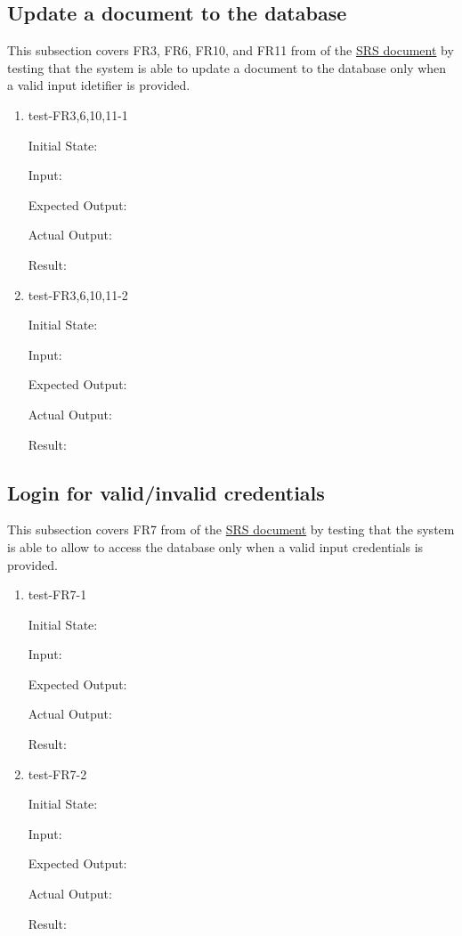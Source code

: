 \documentclass[12pt, titlepage]{article}
\begin{document}
\subsection{Update a document to the database} \label{section:3.3}

This subsection covers FR3, FR6, FR10, and FR11 from of the \href{https://github.com/Inreet-Kaur/capstone/blob/main/docs/SRS/SRS.pdf}{SRS document} by testing that the system is able to update a document to the database only when a valid input idetifier is provided.

\begin{enumerate}

  \item{test-FR3,6,10,11-1} \label{test-FR3,6,10,11-1}
  
  Initial State:

  Input:

  Expected Output:

  Actual Output:

  Result:


  \item{test-FR3,6,10,11-2} \label{test-FR3,6,10,11-2}

  Initial State:

  Input:

  Expected Output:

  Actual Output:

  Result:

\end{enumerate}

\subsection{Login for valid/invalid credentials} \label{section:3.4}

This subsection covers FR7 from of the \href{https://github.com/Inreet-Kaur/capstone/blob/main/docs/SRS/SRS.pdf} {SRS document} by testing that the system is able to allow to access the database only when a valid input credentials is provided.

\begin{enumerate}

  \item{test-FR7-1} \label{test-FR7-1}
  
  Initial State:

  Input:

  Expected Output:

  Actual Output:

  Result:


  \item{test-FR7-2} \label{test-FR7-2}

  Initial State:

  Input:

  Expected Output:

  Actual Output:

  Result:

\end{enumerate}
\end{document}
